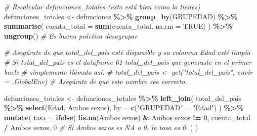 \documentclass[
]{article}
\newenvironment{Shaded}{\begin{snugshade}}{\end{snugshade}}
\newcommand{\AttributeTok}[1]{\textcolor[rgb]{0.13,0.29,0.53}{#1}}
\newcommand{\CommentTok}[1]{\textcolor[rgb]{0.56,0.35,0.01}{\textit{#1}}}
\newcommand{\ConstantTok}[1]{\textcolor[rgb]{0.56,0.35,0.01}{#1}}
\newcommand{\DecValTok}[1]{\textcolor[rgb]{0.00,0.00,0.81}{#1}}
\newcommand{\FunctionTok}[1]{\textcolor[rgb]{0.13,0.29,0.53}{\textbf{#1}}}
\newcommand{\NormalTok}[1]{#1}
\newcommand{\OtherTok}[1]{\textcolor[rgb]{0.56,0.35,0.01}{#1}}
\newcommand{\SpecialCharTok}[1]{\textcolor[rgb]{0.81,0.36,0.00}{\textbf{#1}}}
\newcommand{\StringTok}[1]{\textcolor[rgb]{0.31,0.60,0.02}{#1}}
\begin{document}
\begin{Shaded}
\begin{Highlighting}[]
\CommentTok{\# Recalcular defunciones\_totales (esto está bien como lo tienes)}
\NormalTok{defunciones\_totales }\OtherTok{\textless{}{-}}\NormalTok{ defunciones }\SpecialCharTok{\%\textgreater{}\%}
  \FunctionTok{group\_by}\NormalTok{(GRUPEDAD) }\SpecialCharTok{\%\textgreater{}\%}
  \FunctionTok{summarise}\NormalTok{(}
    \AttributeTok{cuenta\_total =} \FunctionTok{sum}\NormalTok{(cuenta\_total, }\AttributeTok{na.rm =} \ConstantTok{TRUE}\NormalTok{)}
\NormalTok{  ) }\SpecialCharTok{\%\textgreater{}\%}
  \FunctionTok{ungroup}\NormalTok{() }\CommentTok{\# Es buena práctica desagrupar}

\CommentTok{\# Asegúrate de que \textquotesingle{}total\_del\_pais\textquotesingle{} esté disponible y su columna \textquotesingle{}Edad\textquotesingle{} esté limpia}
\CommentTok{\# Si \textquotesingle{}total\_del\_pais\textquotesingle{} es el dataframe \textquotesingle{}01{-}total\_del\_pais\textquotesingle{} que generaste en el primer bucle}
\CommentTok{\# simplemente llámalo así:}
\CommentTok{\# total\_del\_pais \textless{}{-} get("total\_del\_pais", envir = .GlobalEnv) \# Asegúrate de que este nombre sea correcto.}

\NormalTok{defunciones\_totales }\OtherTok{\textless{}{-}}\NormalTok{ defunciones\_totales }\SpecialCharTok{\%\textgreater{}\%}
  \FunctionTok{left\_join}\NormalTok{(}
\NormalTok{    total\_del\_pais }\SpecialCharTok{\%\textgreater{}\%} \FunctionTok{select}\NormalTok{(Edad, }\StringTok{\textasciigrave{}}\AttributeTok{Ambos sexos}\StringTok{\textasciigrave{}}\NormalTok{),}
    \AttributeTok{by =} \FunctionTok{c}\NormalTok{(}\StringTok{"GRUPEDAD"} \OtherTok{=} \StringTok{"Edad"}\NormalTok{)}
\NormalTok{  ) }\SpecialCharTok{\%\textgreater{}\%}
  \FunctionTok{mutate}\NormalTok{(}
    \AttributeTok{tasa =} \FunctionTok{ifelse}\NormalTok{(}
      \SpecialCharTok{!}\FunctionTok{is.na}\NormalTok{(}\StringTok{\textasciigrave{}}\AttributeTok{Ambos sexos}\StringTok{\textasciigrave{}}\NormalTok{) }\SpecialCharTok{\&} \StringTok{\textasciigrave{}}\AttributeTok{Ambos sexos}\StringTok{\textasciigrave{}} \SpecialCharTok{!=} \DecValTok{0}\NormalTok{,}
\NormalTok{      cuenta\_total }\SpecialCharTok{/} \StringTok{\textasciigrave{}}\AttributeTok{Ambos sexos}\StringTok{\textasciigrave{}}\NormalTok{,}
      \DecValTok{0} \CommentTok{\# Si \textquotesingle{}Ambos sexos\textquotesingle{} es NA o 0, la tasa es 0.}
\NormalTok{    )}
\NormalTok{  )}


\end{Highlighting}
\end{Shaded}
\end{document}
